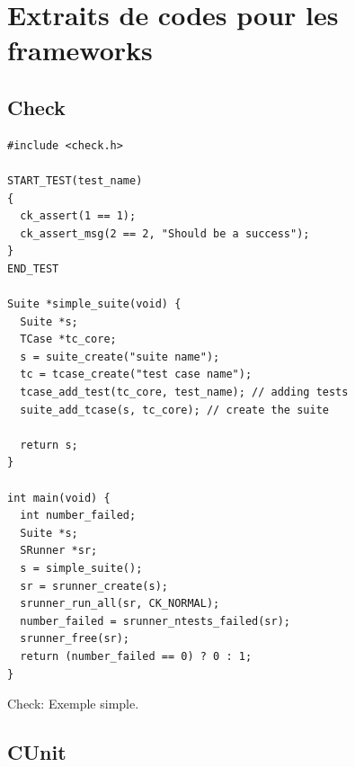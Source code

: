 \documentclass[a4paper]{article}
\newcommand\StartAppendixEntries{}
\renewcommand\StartAppendixEntries{\value{tocdepth}=-10000\relax}%
\edef\maintocdepth{\the\value{tocdepth}}%
\renewcommand\StartAppendixEntries{\value{tocdepth}=\maintocdepth\relax}%
\newcommand*\appendixwithtoc{%
  \clearpage
  \appendix
  \addtocontents{toc}{\protect\StartAppendixEntries}
  \listofatoc
}
\begin{document}
\appendixwithtoc

\clearpage{}
\section{Extraits de codes pour les frameworks}\label{appendix:frameworks-code}

\subsection*{Check}

\begin{listing}[ht!]
\begin{verbatim}
#include <check.h>

START_TEST(test_name)
{
  ck_assert(1 == 1);
  ck_assert_msg(2 == 2, "Should be a success");
}
END_TEST

Suite *simple_suite(void) {
  Suite *s;
  TCase *tc_core;
  s = suite_create("suite name");
  tc = tcase_create("test case name");
  tcase_add_test(tc_core, test_name); // adding tests
  suite_add_tcase(s, tc_core); // create the suite

  return s;
}

int main(void) {
  int number_failed;
  Suite *s;
  SRunner *sr;
  s = simple_suite();
  sr = srunner_create(s);
  srunner_run_all(sr, CK_NORMAL);
  number_failed = srunner_ntests_failed(sr);
  srunner_free(sr);
  return (number_failed == 0) ? 0 : 1;
}
\end{verbatim}
\caption{Check: Exemple simple.}
\label{check-example}
\end{listing}

\clearpage{}
\subsection*{CUnit}
\end{document}
